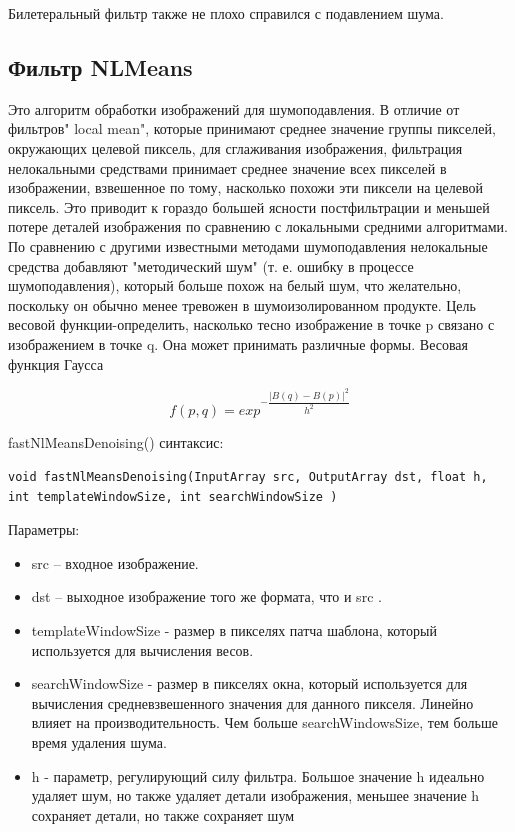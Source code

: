 \documentclass[14pt,a4paper,report]{report}
\begin{document}
Билетеральный фильтр также не плохо справился с подавлением шума.


\subsection{Фильтр NLMeans}

Это алгоритм обработки изображений для шумоподавления. В отличие от фильтров" local mean", которые принимают среднее значение группы пикселей, окружающих целевой пиксель, для сглаживания изображения, фильтрация нелокальными средствами принимает среднее значение всех пикселей в изображении, взвешенное по тому, насколько похожи эти пиксели на целевой пиксель. Это приводит к гораздо большей ясности постфильтрации и меньшей потере деталей изображения по сравнению с локальными средними алгоритмами. По сравнению с другими известными методами шумоподавления нелокальные средства добавляют "методический шум" (т. е. ошибку в процессе шумоподавления), который больше похож на белый шум, что желательно, поскольку он обычно менее тревожен в шумоизолированном продукте. 
Цель весовой функции-определить, насколько тесно изображение в точке p связано с изображением в точке q. Она может принимать различные формы. 
Весовая функция Гаусса

$$ f(p,q) = exp^{-\dfrac{ |B(q)-B(p) |^2}{h^2}} $$

fastNlMeansDenoising() синтаксис:

\begin{lstlisting}
void fastNlMeansDenoising(InputArray src, OutputArray dst, float h, int templateWindowSize, int searchWindowSize )
\end{lstlisting}
Параметры:
\begin{itemize}
\item src – входное изображение.

\item dst – выходное изображение того же формата, что и src .

\item templateWindowSize - размер в пикселях патча шаблона, который используется для вычисления весов. 

\item searchWindowSize - размер в пикселях окна, который используется для вычисления средневзвешенного значения для данного пикселя.  Линейно влияет на производительность. Чем больше searchWindowsSize, тем больше время удаления шума. 
\item h - параметр, регулирующий силу фильтра. Большое значение h идеально удаляет шум, но также удаляет детали изображения, меньшее значение h сохраняет детали, но также сохраняет шум
\end{itemize}
\end{document}
